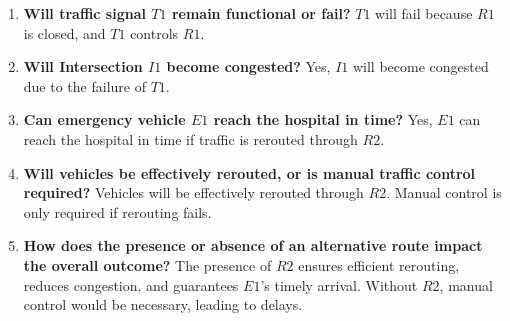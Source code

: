 \documentclass[12pt]{article}
\begin{document}
\begin{enumerate}
    \item \textbf{Will traffic signal $T1$ remain functional or fail?} $T1$ will fail because $R1$ is closed, and $T1$ controls $R1$.
    \item \textbf{Will Intersection $I1$ become congested?} Yes, $I1$ will become congested due to the failure of $T1$.
    \item \textbf{Can emergency vehicle $E1$ reach the hospital in time?} Yes, $E1$ can reach the hospital in time if traffic is rerouted through $R2$.
    \item \textbf{Will vehicles be effectively rerouted, or is manual traffic control required?} Vehicles will be effectively rerouted through $R2$. Manual control is only required if rerouting fails.
    \item \textbf{How does the presence or absence of an alternative route impact the overall outcome?} The presence of $R2$ ensures efficient rerouting, reduces congestion, and guarantees $E1$'s timely arrival. Without $R2$, manual control would be necessary, leading to delays.
\end{enumerate}
\end{document}
